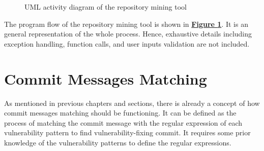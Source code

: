 \documentclass[12pt, a4paper]{report}
\begin{document}
\begin{figure}[H]
  \caption{UML activity diagram of the repository mining tool}
  \label{figure:activity_diagram}
\end{figure}

The program flow of the repository mining tool is shown in
\hyperref[figure:activity_diagram]{\textbf{Figure \ref*{figure:activity_diagram}}}. It is an general
representation of the whole process. Hence, exhaustive details including exception handling,
function calls, and user inputs validation are not included.

\section{Commit Messages Matching} \label{sec:design_commit_matching}
As mentioned in previous chapters and sections, there is already a concept of how commit messages
matching should be functioning. It can be defined as the process of matching the commit message with
the regular expression of each vulnerability pattern to find vulnerability-fixing commit. It
requires some prior knowledge of the vulnerability patterns to define the regular expressions.
\end{document}
